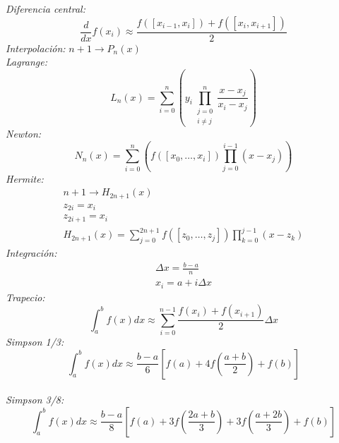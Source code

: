 \documentclass[12pt]{article}
\begin{document}
  \textit{Diferencia central:} $$\frac{d}{dx}f(x_i) \approx \frac{f([x_{i-1}, x_i])+f([x_{i}, x_{i+1}])}{2} $$
  \textit{Interpolación:} $n+1 \rightarrow P_n(x)$\\
  \textit{Lagrange:} $$L_n(x) = \sum_{i=0}^n \left(y_i\prod_{\substack{j=0 \\ i \neq j}}^n \frac{x-x_j}{x_i - x_j}\right)$$
  \textit{Newton:} $$N_n(x) = \sum_{i=0}^n \left(f([x_0, \ldots, x_i]) \prod_{j=0}^{i-1}(x-x_j)\right)$$
  \textit{Hermite:}
  \begin{eqnarray*}
  n+1 \rightarrow H_{2n+1}(x)\\
  z_{2i} = x_i\\
  z_{2i+1} = x_i\\
  H_{2n+1}(x) = \sum_{j=0}^{2n+1}f([z_0, \ldots, z_j])\prod_{k=0}^{j-1}(x - z_k)
  \end{eqnarray*}
  \textit{Integración:}
  \begin{eqnarray*}
   \Delta x = \frac{b-a}{n}\\
   x_i = a + i \Delta x
  \end{eqnarray*}
  \textit{Trapecio:}
  $$\int_a^b f(x)dx \approx \sum_{i=0}^{n-1} \frac{f(x_i) + f(x_{i+1})}{2}\Delta x$$
  \textit{Simpson 1/3:}
  $$ \int_a^b f(x)dx \approx \frac{b-a}{6} \left[f(a) + 4f\left(\frac{a+b}{2} \right) + f(b) \right] $$\\
  \textit{Simpson 3/8:}
  $$ \int_a^b f(x)dx \approx \frac{b-a}{8} \left[f(a) + 3f\left(\frac{2a+b}{3}\right) + 3f\left(\frac{a+2b}{3}\right) + f(b) \right] $$
\end{document}
